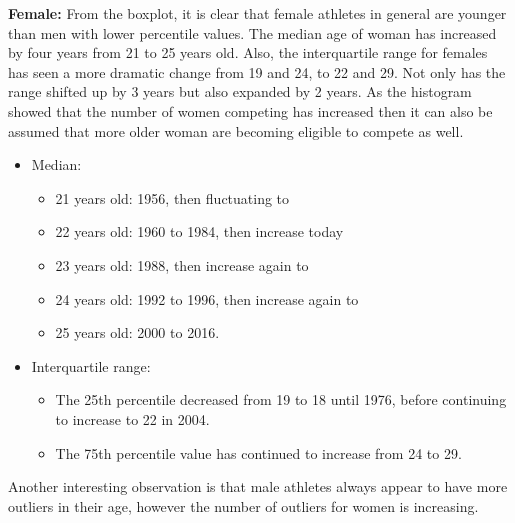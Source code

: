 \documentclass[a4 paper, 12pt]{article}
\begin{document}
        \textbf{Female:} From the boxplot, it is clear that female athletes in general are younger than men with lower percentile values. The median age of woman has increased by four years from 21 to 25 years old. Also, the interquartile range for females has seen a more dramatic change from 19 and 24, to 22 and 29. Not only has the range shifted up by 3 years but also expanded by 2 years. As the histogram showed that the number of women competing has increased then it can also be assumed that more older woman are becoming eligible to compete as well. 
        \begin{itemize}
            \item Median:
                \begin{itemize}
                    \item 21 years old: 1956, then fluctuating to 
                    \item 22 years old: 1960 to 1984, then increase today
                    \item 23 years old: 1988, then increase again to
                    \item 24 years old: 1992 to 1996, then increase again to 
                    \item 25 years old: 2000 to 2016.
                \end{itemize}
            \item Interquartile range:
                \begin{itemize}
                    \item The 25th percentile decreased from 19 to 18 until 1976, before continuing to increase to 22 in 2004.
                    \item The 75th percentile value has continued to increase from 24 to 29. 
                \end{itemize}
        \end{itemize}
        Another interesting observation is that male athletes always appear to have more outliers in their age, however the number of outliers for women is increasing.
\end{document}
